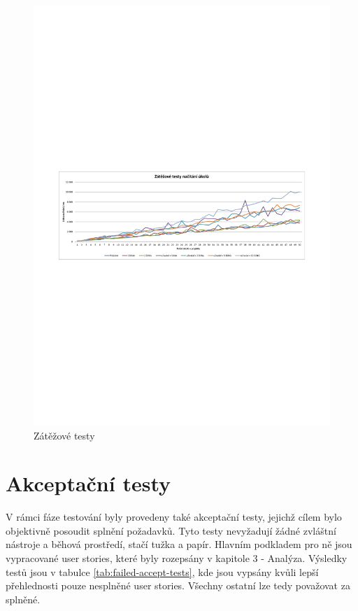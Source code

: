 \begin{figure}[h]
\begin{center}
	\includegraphics[trim=15mm 115mm 15mm 110mm, clip, width=15cm]{figures/zatezove-testy}
	\caption{Zátěžové testy}
	\label{fig:load-tests}
\end{center}
\end{figure}

\section{Akceptační testy}

V rámci fáze testování byly provedeny také akceptační testy, jejichž cílem bylo objektivně posoudit splnění požadavků. Tyto testy nevyžadují žádné zvláštní nástroje a běhová prostředí, stačí tužka a papír. Hlavním podkladem pro ně jsou vypracované user stories, které byly rozepsány v kapitole 3 - Analýza. Výsledky testů jsou v tabulce \ref{tab:failed-accept-tests}, kde jsou vypsány kvůli lepší přehlednosti pouze nesplněné user stories. Všechny ostatní lze tedy považovat za splněné.

